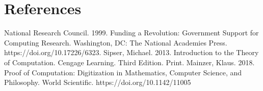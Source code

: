\documentclass{article}
\begin{document}
\section{References}
\begin{thebibliography}{100}
	 National Research Council. 1999. Funding a Revolution: Government Support for Computing Research. Washington, DC: The National Academies Press. https://doi.org/10.17226/6323.
	 Sipser, Michael. 2013. Introduction to the Theory of Computation. Cengage Learning. Third Edition. Print.
	 Mainzer, Klaus. 2018. Proof of Computation: Digitization in Mathematics, Computer Science, and Philosophy. World Scientific. https://doi.org/10.1142/11005
\end{thebibliography}
\end{document}
